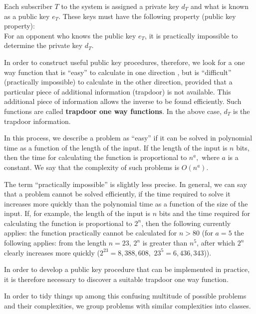 Each subscriber $ T $ to the system is assigned a private  
 key $ d_T $   and what is known as a public key $ e_T $. 
These keys must have the following property (public key property):\\
For an opponent who knows the public key $ e_T $, it is practically impossible 
to determine the private key  $ d_T $.\par

In order to construct useful public key procedures, therefore, we look for a 
one way function that is ``easy'' to calculate in one direction {}, but 
is ``difficult'' (practically impossible) to calculate in the other 
direction, provided that a particular piece of additional information 
 (trapdoor) is not available. This 
additional piece of information allows the inverse to be found efficiently. Such 
functions are called {\bf trapdoor one way functions}. In the above case, $ d_T 
$ is the trapdoor information. \par

In this process, we describe a problem as ``easy'' if it can be solved in 
 polynomial time as a function of the length of the 
input. If the length of the input is $ n $ bits, then the time for calculating 
the function is proportional to $ n^{a}, $ where $ a $  is a constant. We say 
that the  complexity of such problems is $ O(n^{a}) $. 


The term ``practically impossible'' is slightly less precise. In 
general, we can say that a problem cannot be solved  
efficiently, if the time required to solve it increases more quickly than the 
polynomial time as a function of the size of the input. If, for example, the 
length of the input is $ n $  bits and the time required for calculating the 
function is proportional to $ 2^n $, then the following currently applies: the 
function practically cannot be calculated for $n > 80$ (for $ a=5 $ the 
following applies: from the length $ n=23 $, $ 2^n$ is greater than $n^5 $, after 
which $ 2^n $ clearly increases more quickly ($ 2^{23}=8,388,608, $ $ 23^5= 
6,436,343 $)).\par 

In order to develop a public key procedure that can be implemented in practice, 
it is therefore necessary to discover a suitable trapdoor one way function.\par

In order to tidy things up among this confusing multitude of possible problems 
and their complexities, we group problems with similar complexities into 
classes.

